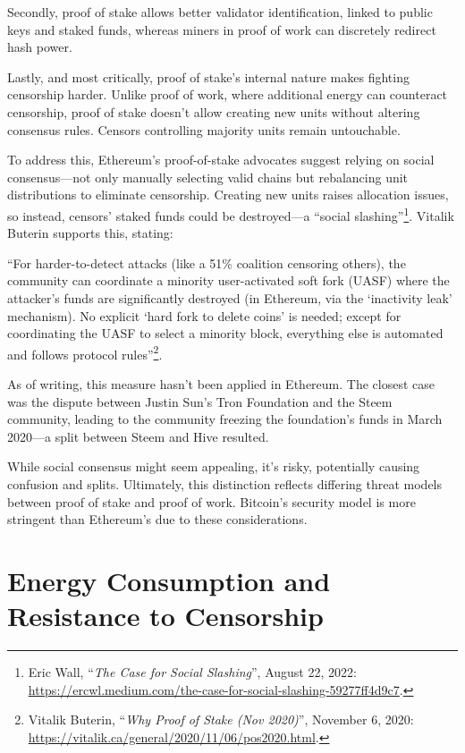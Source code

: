 \documentclass[
  a5paper,
  smalldemyvopaper,10pt,twoside,onecolumn,openright,extrafontsizes,hidelinks]{memoir}
\begin{document}
Secondly, proof of stake allows better validator identification, linked
to public keys and staked funds, whereas miners in proof of work can
discretely redirect hash power.

Lastly, and most critically, proof of stake's internal nature makes
fighting censorship harder. Unlike proof of work, where additional
energy can counteract censorship, proof of stake doesn't allow creating
new units without altering consensus rules. Censors controlling majority
units remain untouchable.

To address this, Ethereum's proof-of-stake advocates suggest relying on
social consensus---not only manually selecting valid chains but
rebalancing unit distributions to eliminate censorship. Creating new
units raises allocation issues, so instead, censors' staked funds could
be destroyed---a ``social slashing''\footnote{Eric Wall, ``\emph{The
  Case for Social Slashing}'', August 22, 2022:
  \url{https://ercwl.medium.com/the-case-for-social-slashing-59277ff4d9c7}.}.
Vitalik Buterin supports this, stating:

``For harder-to-detect attacks (like a 51\% coalition censoring others),
the community can coordinate a minority user-activated soft fork (UASF)
where the attacker's funds are significantly destroyed (in Ethereum, via
the `inactivity leak' mechanism). No explicit `hard fork to delete
coins' is needed; except for coordinating the UASF to select a minority
block, everything else is automated and follows protocol
rules''\footnote{Vitalik Buterin, ``\emph{Why Proof of Stake (Nov
  2020)}'', November 6, 2020:
  \url{https://vitalik.ca/general/2020/11/06/pos2020.html}.}.

As of writing, this measure hasn't been applied in Ethereum. The closest
case was the dispute between Justin Sun's Tron Foundation and the Steem
community, leading to the community freezing the foundation's funds in
March 2020---a split between Steem and Hive resulted.

While social consensus might seem appealing, it's risky, potentially
causing confusion and splits. Ultimately, this distinction reflects
differing threat models between proof of stake and proof of work.
Bitcoin's security model is more stringent than Ethereum's due to these
considerations.

\section*{Energy Consumption and Resistance to
Censorship}\label{consommation-duxe9nergie-et-ruxe9sistance-uxe0-la-censure}
\end{document}

